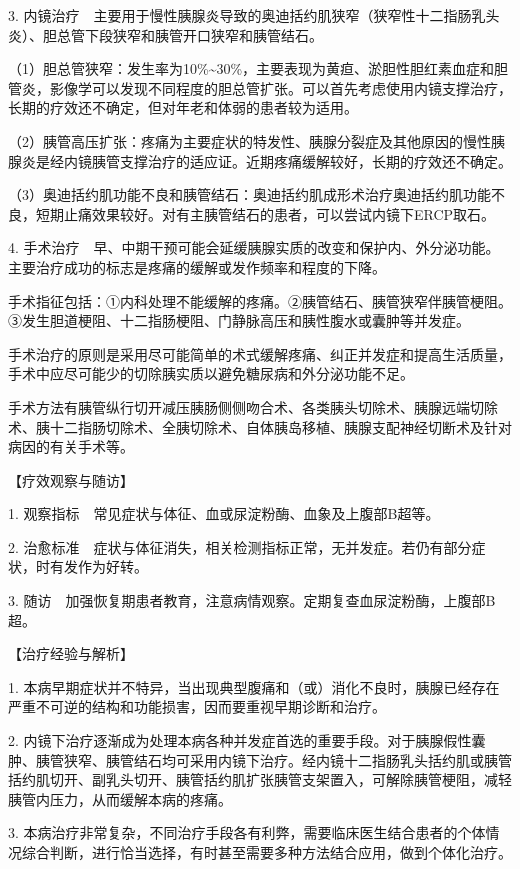 3.
内镜治疗　主要用于慢性胰腺炎导致的奥迪括约肌狭窄（狭窄性十二指肠乳头炎）、胆总管下段狭窄和胰管开口狭窄和胰管结石。

（1）胆总管狭窄：发生率为10\%\textasciitilde{}30\%，主要表现为黄疸、淤胆性胆红素血症和胆管炎，影像学可以发现不同程度的胆总管扩张。可以首先考虑使用内镜支撑治疗，长期的疗效还不确定，但对年老和体弱的患者较为适用。

（2）胰管高压扩张：疼痛为主要症状的特发性、胰腺分裂症及其他原因的慢性胰腺炎是经内镜胰管支撑治疗的适应证。近期疼痛缓解较好，长期的疗效还不确定。

（3）奥迪括约肌功能不良和胰管结石：奥迪括约肌成形术治疗奥迪括约肌功能不良，短期止痛效果较好。对有主胰管结石的患者，可以尝试内镜下ERCP取石。

4.
手术治疗　早、中期干预可能会延缓胰腺实质的改变和保护内、外分泌功能。主要治疗成功的标志是疼痛的缓解或发作频率和程度的下降。

手术指征包括：①内科处理不能缓解的疼痛。②胰管结石、胰管狭窄伴胰管梗阻。③发生胆道梗阻、十二指肠梗阻、门静脉高压和胰性腹水或囊肿等并发症。

手术治疗的原则是采用尽可能简单的术式缓解疼痛、纠正并发症和提高生活质量，手术中应尽可能少的切除胰实质以避免糖尿病和外分泌功能不足。

手术方法有胰管纵行切开减压胰肠侧侧吻合术、各类胰头切除术、胰腺远端切除术、胰十二指肠切除术、全胰切除术、自体胰岛移植、胰腺支配神经切断术及针对病因的有关手术等。

【疗效观察与随访】

1. 观察指标　常见症状与体征、血或尿淀粉酶、血象及上腹部B超等。

2.
治愈标准　症状与体征消失，相关检测指标正常，无并发症。若仍有部分症状，时有发作为好转。

3.
随访　加强恢复期患者教育，注意病情观察。定期复查血尿淀粉酶，上腹部B超。

【治疗经验与解析】

1.
本病早期症状并不特异，当出现典型腹痛和（或）消化不良时，胰腺已经存在严重不可逆的结构和功能损害，因而要重视早期诊断和治疗。

2.
内镜下治疗逐渐成为处理本病各种并发症首选的重要手段。对于胰腺假性囊肿、胰管狭窄、胰管结石均可采用内镜下治疗。经内镜十二指肠乳头括约肌或胰管括约肌切开、副乳头切开、胰管括约肌扩张胰管支架置入，可解除胰管梗阻，减轻胰管内压力，从而缓解本病的疼痛。

3.
本病治疗非常复杂，不同治疗手段各有利弊，需要临床医生结合患者的个体情况综合判断，进行恰当选择，有时甚至需要多种方法结合应用，做到个体化治疗。


